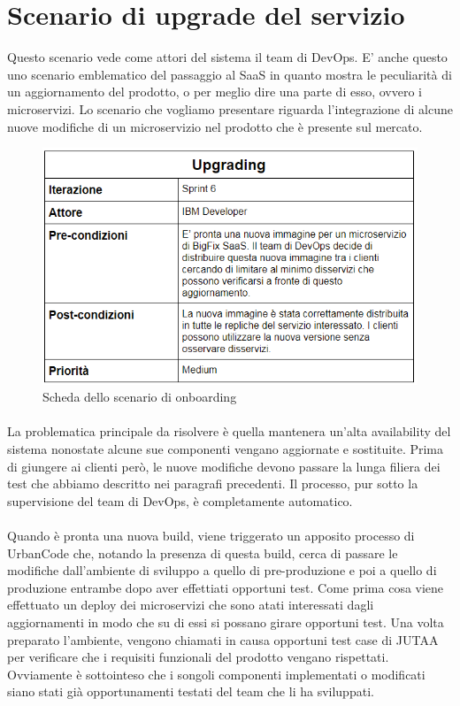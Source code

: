 \section{Scenario di upgrade del servizio}
Questo scenario vede come attori del sistema il team di DevOps. E' anche questo uno scenario emblematico del passaggio al SaaS in quanto mostra le peculiarità di un aggiornamento del prodotto, o per meglio dire una parte di esso, ovvero i microservizi. Lo scenario che vogliamo presentare riguarda l'integrazione di alcune nuove modifiche di un microservizio nel prodotto che è presente sul mercato. 
\begin{figure}[h]
	\centering
	\includegraphics[width=0.7\linewidth]{capitoli/imgs/upgradescenarioScheda}
	\caption{Scheda dello scenario di onboarding}
	\label{fig:upgradescenarioscheda}
\end{figure}
\paragraph{}
La problematica principale da risolvere è quella mantenera un'alta availability del sistema nonostate alcune sue componenti vengano aggiornate e sostituite. Prima di giungere ai clienti però, le nuove modifiche devono passare la lunga filiera dei test che abbiamo descritto nei paragrafi precedenti. Il processo, pur sotto la supervisione del team di DevOps, è completamente automatico. 
\paragraph{}
Quando è pronta una nuova build, viene triggerato un apposito processo di UrbanCode che, notando la presenza di questa build, cerca di passare le modifiche dall'ambiente di sviluppo a quello di pre-produzione e poi a quello di produzione entrambe dopo aver effettiati opportuni test. Come prima cosa viene effettuato un deploy dei microservizi che sono atati interessati dagli aggiornamenti in modo che su di essi si possano girare opportuni test. Una volta preparato l'ambiente, vengono chiamati in causa opportuni test case di JUTAA per verificare che i requisiti funzionali del prodotto vengano rispettati. Ovviamente è sottointeso che i songoli componenti implementati o modificati siano stati già opportunamenti testati del team che li ha sviluppati. 
